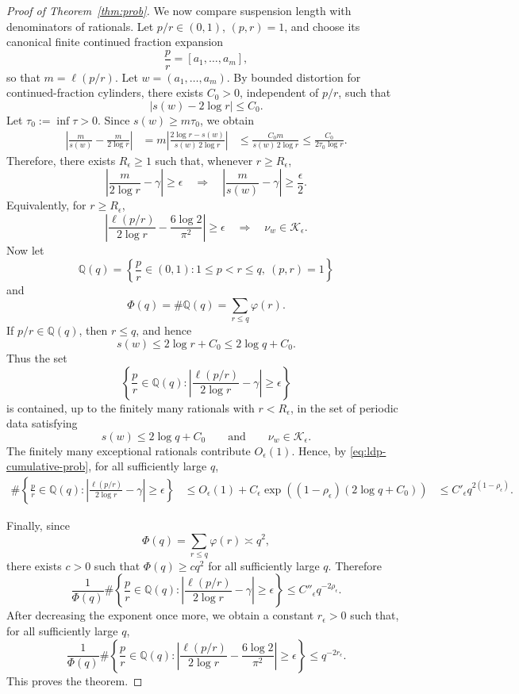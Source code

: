 \documentclass[10pt,a4paper]{amsart}
\def\Q{{\mathbb Q}}
\def\ge{\geqslant}
\def\le{\leqslant}
\begin{document}
\begin{proof}[Proof of Theorem~\ref{thm:prob}]
We now compare suspension length with denominators of rationals. Let
\(p/r\in(0,1)\), \((p,r)=1\), and choose its canonical finite continued
fraction expansion
\[
\frac pr=[a_1,\ldots,a_m],
\]
so that \(m=\ell(p/r)\). Let \(w=(a_1,\ldots,a_m)\). By bounded distortion for
continued-fraction cylinders, there exists \(C_0>0\), independent of \(p/r\),
such that
\begin{equation}\label{eq:susp-denom-comparison}
\left|s(w)-2\log r\right|\le C_0 .
\end{equation}
Let $\tau_0:=\inf\tau>0.$ Since $s(w)\ge m\tau_0$, we obtain
\[
\begin{aligned}
\left|
\frac{m}{s(w)}
-
\frac{m}{2\log r}
\right|
&=
m
\left|
\frac{2\log r-s(w)}{s(w)\,2\log r}
\right|  
&\le
\frac{C_0m}{s(w)\,2\log r}
\le
\frac{C_0}{2\tau_0\log r}.
\end{aligned}
\]
Therefore, there exists \(R_\epsilon\ge1\) such that, whenever
\(r\ge R_\epsilon\),
\[
\left|
\frac{m}{2\log r}-\gamma
\right|
\ge \epsilon
\quad\Longrightarrow\quad
\left|
\frac{m}{s(w)}-\gamma
\right|
\ge \frac{\epsilon}{2}.
\]
Equivalently, for \(r\ge R_\epsilon\),
\[
\left|
\frac{\ell(p/r)}{2\log r}
-
\frac{6\log 2}{\pi^2}
\right|
\ge \epsilon
\quad\Longrightarrow\quad
\nu_w\in\mathcal K_\epsilon .
\]
Now let
\[
\Q(q)
=
\left\{
\frac pr\in(0,1):
1\le p<r\le q,\ (p,r)=1
\right\}
\]
and
\[
\Phi(q)=\#\Q(q)=\sum_{r\le q}\varphi(r).
\]
If \(p/r\in\Q(q)\), then \(r\le q\), and hence
\[
s(w)\le 2\log r+C_0\le 2\log q+C_0.
\]
Thus the set
\[
\left\{
\frac pr\in\Q(q):
\left|
\frac{\ell(p/r)}{2\log r}-\gamma
\right|
\ge\epsilon
\right\}
\]
is contained, up to the finitely many rationals with \(r<R_\epsilon\), in the
set of periodic data satisfying
\[
s(w)\le 2\log q+C_0
\qquad\text{and}\qquad
\nu_w\in\mathcal K_\epsilon .
\]
The finitely many exceptional rationals contribute \(O_\epsilon(1)\). Hence,
by \eqref{eq:ldp-cumulative-prob}, for all sufficiently large \(q\),
\[
\begin{aligned}
\#\left\{
\frac pr\in\Q(q):
\left|
\frac{\ell(p/r)}{2\log r}-\gamma
\right|
\ge\epsilon
\right\}
&\le
O_\epsilon(1)
+
C_\epsilon
\exp\left((1-\rho_\epsilon)(2\log q+C_0)\right) 
&\le
C'_\epsilon q^{2(1-\rho_\epsilon)} .
\end{aligned}
\]

Finally, since
\[
\Phi(q)=\sum_{r\le q}\varphi(r)\asymp q^2,
\]
there exists \(c>0\) such that \(\Phi(q)\ge cq^2\) for all sufficiently large
\(q\). Therefore
\[
\frac{1}{\Phi(q)}
\#\left\{
\frac pr\in\Q(q):
\left|
\frac{\ell(p/r)}{2\log r}-\gamma
\right|
\ge\epsilon
\right\}
\le
C''_\epsilon q^{-2\rho_\epsilon}.
\]
After decreasing the exponent once more, we obtain a constant
\(r_\epsilon>0\) such that, for all sufficiently large \(q\),
\[
\frac{1}{\Phi(q)}
\#
\left\{
\frac pr\in\Q(q):
\left|
\frac{\ell(p/r)}{2\log r}
-
\frac{6\log 2}{\pi^2}
\right|
\ge\epsilon
\right\}
\le
q^{-2r_\epsilon}.
\]
This proves the theorem.
\end{proof}
\end{document}
